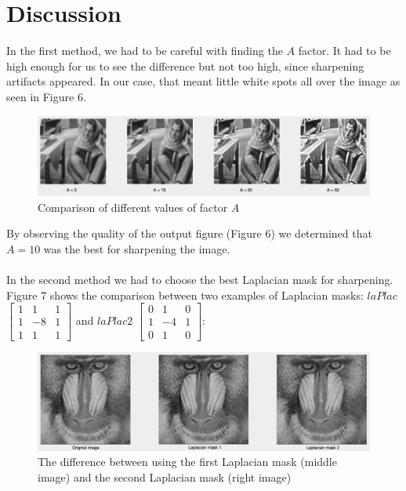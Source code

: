 \documentclass{article}
\begin{document}
\section{Discussion}
In the first method, we had to be careful with finding the $A$ factor. It had to be high enough for us to see the difference but not too high, since sharpening artifacts appeared. In our case, that meant little white spots all over the image as seen in Figure 6.
\begin{figure}[H]
\centering
\includegraphics[width=\linewidth]{a-ji.png}
\caption{Comparison of different values of factor $A$}
\label{fig:badLes}
\end{figure}
By observing the quality of the output figure (Figure 6) we determined that $A = 10$ was the best for sharpening the image.
\newline
\newline
\\ \\
In the second method we had to choose the best Laplacian mask for sharpening. Figure 7 shows the comparison between two examples of Laplacian masks: $laPlac$ $\begin{bmatrix} 
1 & 1 & 1\\ 
1 & -8 & 1\\ 
1 & 1 & 1  
\end{bmatrix}$ and $laPlac2$ $\begin{bmatrix} 
0 & 1 & 0\\ 
1 & -4 & 1\\ 
0 & 1 & 0  
\end{bmatrix}$:

\begin{figure}[H]
\centering
\includegraphics[width=\linewidth]{masks.png}
\caption{The difference between using the first Laplacian mask (middle image) and the second Laplacian mask (right image)}
\label{fig:badLes}
\end{figure}
\end{document}
